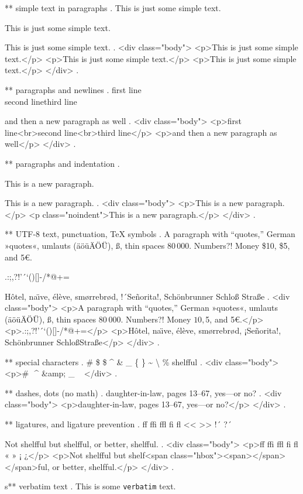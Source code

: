 ** simple text in paragraphs
.
This is just some simple text.

This is just some simple text.

This is just some simple text.
.
<div class="body">
<p>This is just some simple text.</p>
<p>This is just some simple text.</p>
<p>This is just some simple text.</p>
</div>
.


** paragraphs and newlines
.
first line\\second line\newline third line\par and then a new paragraph as well
.
<div class="body">
<p>ﬁrst line<br>second line<br>third line</p>
<p>and then a new paragraph as well</p>
</div>
.


** paragraphs and indentation
.
\noindent

\noindent

This is a new paragraph.

\noindent
This is a new paragraph.
.
<div class="body">
<p>This is a new paragraph.</p>
<p class="noindent">This is a new paragraph.</p>
</div>
.


** UTF-8 text, punctuation, TeX symbols
.
A para\-graph with “quotes,” German »quotes«, umlauts (äöüÄÖÜ), ß, thin spaces 80\,000. Numbers?! Money \$10, \$5, and 5€.

.:;,?!'´`()[]-/*@+=

H\^otel, na\"\i ve, \'el\`eve, sm\o rrebr\o d, !´Se\~norita!, Sch\"onbrunner Schlo\ss{} Stra\ss e
.
<div class="body">
<p>A para­graph with “quotes,” German »quotes«, umlauts (äöüÄÖÜ), ß, thin spaces 80 000. Numbers?! Money $10, $5, and 5€.</p>
<p>.:;,?!’´‘()[]‐/*@+=</p>
<p>Hôtel, naı̈ve, élève, smørrebrød, ¡Señorita!, Schönbrunner Schloß​ Straße</p>
</div>
.


** special characters
.
\# \$ \$ \^{} \& \_ \{ \} \~{} \textbackslash{} \% shelf\-ful
.
<div class="body">
<p># $ $ ^​ &amp; _ { } ~​ \​ %
</div>
.


** dashes, dots (no math)
.
daughter-in-law, pages 13--67, yes---or no?
.
<div class="body">
<p>daughter‐in‐law, pages 13–67, yes—or no?</p>
</div>
.


** ligatures, and ligature prevention
.
ff ffi ffl fi fl << >> !´ ?´

Not shelfful but shelf\mbox{}ful, or better, shelf\/ful.
.
<div class="body">
<p>ﬀ ﬃ ﬄ ﬁ ﬂ « » ¡ ¿</p>
<p>Not shelﬀul but shelf<span class="hbox"><span></span></span>ful, or better, shelf‌ful.</p>
</div>
.


s** verbatim text
.
This is some \verb|verbatim| text.

